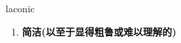 
\begin{frame}
{\huge laconic}
\begin{center}
\begin{enumerate}\Large
  \item \textbf{简洁(以至于显得粗鲁或难以理解的)}
\end{enumerate}
\end{center}
\end{frame}
